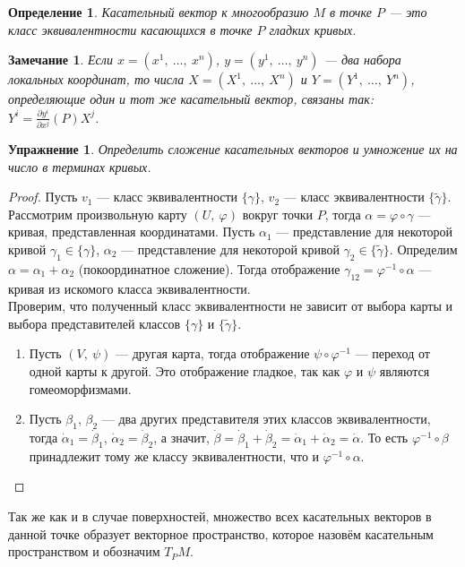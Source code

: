\documentclass[12pt]{article}
\theoremstyle{plain}
\newtheorem*{exercise}{Упражнение}
\newtheorem{definition}{Определение}[section]
\newtheorem{remark}{Замечание}
\renewcommand{\phi}{\varphi}
\begin{document}
    \begin{definition}
        Касательный вектор к многообразию $M$ в точке $P$ --- это класс эквивалентности касающихся в точке $P$ гладких кривых.
    \end{definition}
    \begin{remark}
        Если $x=(x^1, \ \ldots, \ x^n)$, $y=(y^1, \ \ldots, \ y^n)$ --- два набора локальных координат, то числа $X=(X^1, \ \ldots, \ X^n)$ и $Y=(Y^1, \ \ldots, \ Y^n)$,  определяющие один и тот же касательный вектор, связаны так: $Y^i=\frac{\partial y^i}{\partial x^j}(P)X^j$.
    \end{remark}
    \begin{exercise}
        Определить сложение касательных векторов и умножение их на число в терминах кривых.
    \end{exercise}
    \begin{proof}
        Пусть $v_1$ --- класс эквивалентности $\{\gamma\}$, $v_2$ --- класс эквивалентности $\{\tilde{\gamma}\}$. Рассмотрим произвольную карту $(U, \ \phi)$ вокруг точки $P$, тогда $\alpha=\phi\circ\gamma$ --- кривая, представленная координатами. Пусть $\alpha_1$ --- представление для некоторой кривой $\gamma_1\in\{\gamma\}$, $\alpha_2$ --- представление для некоторой кривой $\gamma_2\in\{\tilde{\gamma}\}$. Определим $\alpha=\alpha_1+\alpha_2$ (покоординатное сложение). Тогда отображение $\gamma_{12}=\phi^{-1}\circ\alpha$ --- кривая из искомого класса эквивалентности.\\
        Проверим, что полученный класс эквивалентности не зависит от выбора карты и выбора представителей классов $\{\gamma\}$ и  $\{\tilde{\gamma}\}$.
        \begin{enumerate}
            \item Пусть $(V, \ \psi)$ --- другая карта, тогда отображение $\psi\circ\phi^{-1}$ --- переход от одной карты к другой. Это отображение гладкое, так как $\phi$ и $\psi$ являются гомеоморфизмами.
            \item Пусть $\beta_1$, $\beta_2$ --- два других представителя этих классов эквивалентности, тогда $\dot{\alpha}_1=\dot{\beta}_1$, $\dot{\alpha}_2=\dot{\beta}_2$, а значит, $\dot{\beta}=\dot{\beta}_1+\dot{\beta}_2=\dot{\alpha}_1+\dot{\alpha}_2=\dot{\alpha}$. То есть $\phi^{-1}\circ\beta$ принадлежит тому же классу эквивалентности, что и $\phi^{-1}\circ\alpha$.
        \end{enumerate}
    \end{proof}
    Так же как и в случае поверхностей, множество всех касательных векторов в данной точке образует векторное пространство, которое назовём касательным пространством и обозначим $T_PM$.\\
\end{document}
